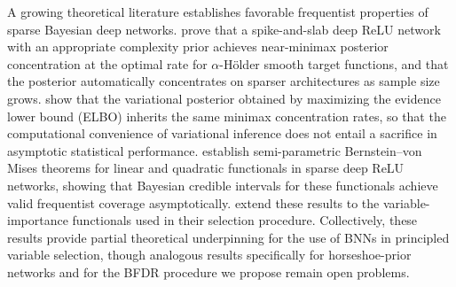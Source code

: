 A growing theoretical literature establishes favorable frequentist
properties of sparse Bayesian deep networks.
\citet{polson_posterior_2018} prove that a spike-and-slab deep ReLU
network with an appropriate complexity prior achieves near-minimax
posterior concentration at the optimal rate for $\alpha$-H\"{o}lder
smooth target functions, and that the posterior automatically
concentrates on sparser architectures as sample size grows. \citet{cherief-abdellatif_consistency_2018, cherief-abdellatif_generalization_2019} show that the variational
posterior obtained by maximizing the evidence lower bound (ELBO)
inherits the same minimax concentration rates, so that the
computational convenience of variational inference does not entail
a sacrifice in asymptotic statistical performance.
\citet{wang_uncertainty_2020} establish semi-parametric
Bernstein--von Mises theorems for linear and quadratic functionals
in sparse deep ReLU networks, showing that Bayesian credible
intervals for these functionals achieve valid frequentist coverage
asymptotically.  \citet{liu_variable_2021} extend these results to
the variable-importance functionals used in their selection procedure.
Collectively, these results provide partial theoretical underpinning
for the use of BNNs in principled variable selection, though
analogous results specifically for horseshoe-prior networks and
for the BFDR procedure we propose remain open problems.




